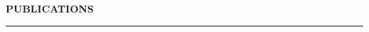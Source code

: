 \documentclass{article}[12pt]
\newcommand{\negind}{\hspace*{-15pt}}
\newcommand{\presentation}[3]{\negind ``#1" \hfill  #2
\smallskip
\hfill \parbox[b]{.93\textwidth}{ #3 }
\smallskip }
\begin{document}







\medskip                                                            %

\noindent \textbf{{\large PUBLICATIONS}}


\medskip
{\large\scshape\hrule\vspace{0.8\baselineskip}} %
\medskip                                                            %
\end{document}
